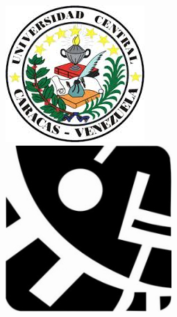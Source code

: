 \label{ch:portada}
\thispagestyle{empty}

\begin{figure}[!htb]
	\raggedright
	\includegraphics[width=\linewidth]{Figuras/ucv_logo.jpg}
	\endminipage\hfill
	\raggedleft
	\includegraphics[width=\linewidth]{Figuras/logo_ciencias.jpg}
	\endminipage\hfill
\end{figure}


